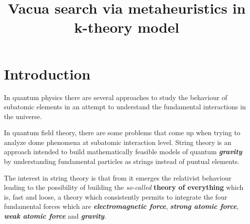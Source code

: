 \documentclass[pdflatex,lineno,sn-mathphys-num]{sn-jnl}
\begin{document}
\nocite{*}
\title[Vacua search via metaheuristics in k-theory]{Vacua search via metaheuristics in k-theory model}
\author*[1]{%
   
}

\author[1]{%
   
}

\author[2]{%
   
}





\maketitle

\section{Introduction} \label{sec:intro}
In quantum physics there are several approaches to study the behaviour of subatomic elements in an attempt to understand the fundamental interactions in the universe.

In quantum field theory, there are some problems that come up when trying to analyze dome phenomena at subatomic interaction level.
String theory is an approach intended to build mathematically feasible models of quantum \textit{\bfseries gravity}\cite{StringTheoryAndMTheory} by understanding fundamental particles as strings instead of puntual elements.

The interest in string theory is that from it emerges the relativist behaviour leading to the possibility of building the \textit{so-called} \textbf{theory of everything} which is, fast and loose, a theory which consistently permits to integrate the four fundamental forces which are \textit{\textbf{electromagnetic force}}, \textit{\textbf{strong atomic force}}, \textit{\textbf{weak atomic force}} and \textit{\textbf{gravity}}.
\end{document}
